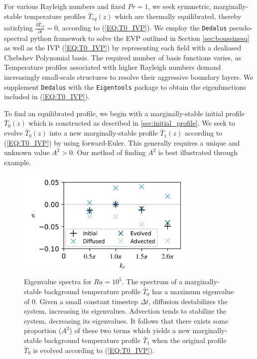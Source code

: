 \documentclass[reprint,amsmath,amssymb,aps]{revtex4-1}
\begin{document}
\par For various Rayleigh numbers and fixed $Pr = 1$, we seek symmetric, marginally-stable temperature profiles $\bar{T}_{eq}(z)$ which are thermally equilibrated, thereby satisfying $\frac{\partial \bar{T}_{eq}}{\partial t} = 0$, according to (\ref{EQ:T0_IVP}). We employ the \texttt{Dedalus} pseudo-spectral python framework to solve the EVP outlined in Section \ref{sec:boussinesq} as well as the IVP (\ref{EQ:T0_IVP}) by representing each field with a dealiased Chebshev Polynomial basis. The required number of basis functions varies, as Temperature profiles associated with higher Rayleigh numbers demand increasingly small-scale structures to resolve their aggressive boundary layers. We supplement \texttt{Dedalus} with the \texttt{Eigentools} package to obtain the eigenfunctions included in (\ref{EQ:T0_IVP}).
\par To find an equilibrated profile, we begin with a marginally-stable initial profile $\bar{T}_0(z)$ which is constructed as described in \ref{sec:initial_profile}. We seek to evolve $\bar{T}_0(z)$ into a new marginally-stable profile $\bar{T}_1(z)$ according to (\ref{EQ:T0_IVP}) by using forward-Euler. This generally requires a unique and unknown value $A^2 > 0$. Our method of finding $A^2$ is best illustrated through example.

\begin{figure}[h]
    \includegraphics[width=3.4in]{EV_spectrum_ol.png}
    \caption{Eigenvalue spectra for $Ra = 10^5$. The spectrum of a marginally-stable background temperature profile $\bar{T}_0$ has a maximum eigenvalue of 0. Given a small constant timestep $\Delta t$, diffusion destabilizes the system, increasing its eigenvalues. Advection tends to stabilize the system, decreasing its eigenvalues. It follows that there exists some proportion ($A^2$) of these two terms which yields a new marginally-stable background temperature profile $\bar{T}_1$ when the original profile $\bar{T}_0$ is evolved according to (\ref{EQ:T0_IVP}).}
    \label{fig:iteration_spectra} 
\end{figure}
\end{document}
